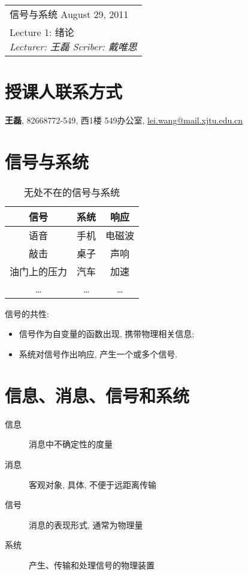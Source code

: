 \clearpage \noindent\begin{tabularx}{\linewidth}{|X|}
\hline \vskip -2mm
{\sf 信号与系统} \hfill August 29, 2011 \\
{\centering \sf \large Lecture 1:
绪论 \\ }
\textit{Lecturer: 王磊 \hfill Scriber: 戴唯思}\\ \hline
\end{tabularx}
\setcounter{section}{0}
\renewcommand{\thepage}{\lecture -\arabic{page}}
\def\lecture{1}

\section{授课人联系方式}

    \textbf{王磊}, 82668772-549, 西1楼 549办公室, \url{lei.wang@mail.xjtu.edu.cn}

\section{信号与系统}

    \begin{table}[h] \centering
        \caption{无处不在的信号与系统}
        \label{tab:1:signals-and-systems-everywhere}
        \begin{tabular}{ccc} \toprule
            信号 & 系统 & 响应 \\ \midrule
            语音 & 手机 & 电磁波 \\
            敲击 & 桌子 & 声响 \\
            油门上的压力 & 汽车 & 加速 \\
            \ldots & \ldots & \ldots \\
            \bottomrule
        \end{tabular}
    \end{table}

    信号的共性:

    \begin{itemize}
        \item 信号作为自变量的函数出现, 携带物理相关信息;
        \item 系统对信号作出响应, 产生一个或多个信号.
    \end{itemize}

\section{信息、消息、信号和系统}

    \begin{description}
        \item[信息] 消息中不确定性的度量
        \item[消息] 客观对象, 具体, 不便于远距离传输
        \item[信号] 消息的表现形式, 通常为物理量
        \item[系统] 产生、传输和处理信号的物理装置
    \end{description}

